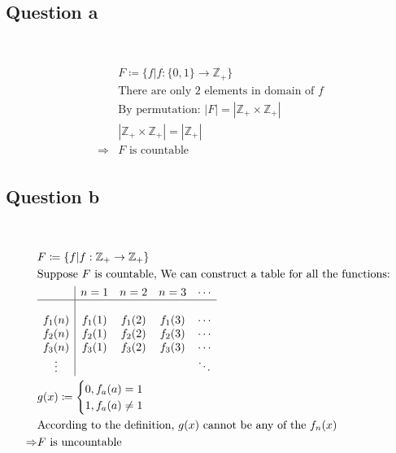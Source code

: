 \documentclass{article}
\begin{document}
~

\subsection*{Question a}

~

\begin{equation*}
    \begin{split}
        &F\coloneqq \{f|f:\{0,1\}\rightarrow\mathbb{Z}_+\}\\
        &\text{There are only 2 elements in domain of }f\\
        &\text{By permutation: }|F|=|\mathbb{Z}_+ \times\mathbb{Z}_+| \\
        &|\mathbb{Z}_+ \times\mathbb{Z}_+|=|\mathbb{Z}_+|\\
        \Rightarrow&F\text{ is countable}\\
    \end{split}
\end{equation*}

\subsection*{Question b}

~

\begin{equation*}
    \begin{split}
        &F\coloneqq \{f|f:\mathbb{Z}_+\rightarrow\mathbb{Z}_+\}\\
        &\text{Suppose }F\text{ is countable, We can construct a table for all the functions: }\\
        &\begin{array}{c|cccc}
            &n=1&n=2&n=3&\cdots\\
            \hline\\
            f_1(n)&f_1(1)&f_1(2)&f_1(3)&\cdots\\
            f_2(n)&f_2(1)&f_2(2)&f_2(3)&\cdots\\
            f_3(n)&f_3(1)&f_3(2)&f_3(3)&\cdots\\
            \vdots &&&&\ddots \\
        \end{array}\\
        &g(x)\coloneqq \begin{cases}
            0,f_a(a)=1\\
            1,f_a(a)\ne 1\\
        \end{cases}\\
        &\text{According to the definition, }g(x)\text{ cannot be any of the }f_n(x)\\
        \Rightarrow& F\text{ is uncountable}\\
    \end{split}
\end{equation*}
\end{document}
